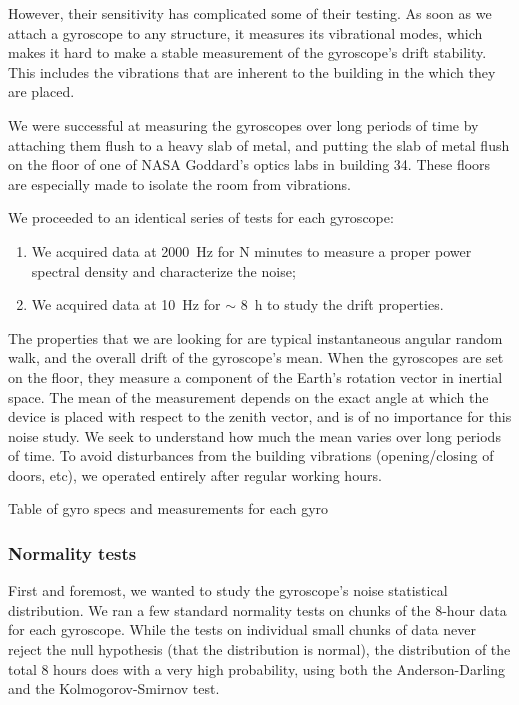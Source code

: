 However, their sensitivity has complicated some of their testing. As soon as we attach a gyroscope to any structure, it measures its vibrational modes, which makes it hard to make a stable measurement of the gyroscope's drift stability. This includes the vibrations that are inherent to the building in the which they are placed.

We were successful at measuring the gyroscopes over long periods of time by attaching them flush to a heavy slab of metal, and putting the slab of metal flush on the floor of one of NASA Goddard's optics labs in building 34. These floors are especially made to isolate the room from vibrations.

We proceeded to an identical series of tests for each gyroscope:
\begin{enumerate}
\item We acquired data at \SI{2000}{\hertz} for N minutes to measure a proper power spectral density and characterize the noise;
\item We acquired data at \SI{10}{\hertz} for $\sim$ \SI{8}{\hour} to study the drift properties.
\end{enumerate}

The properties that we are looking for are typical instantaneous angular random walk, and the overall drift of the gyroscope's mean. When the gyroscopes are set on the floor, they measure a component of the Earth's rotation vector in inertial space. The mean of the measurement depends on the exact angle at which the device is placed with respect to the zenith vector, and is of no importance for this noise study. We seek to understand how much the mean varies over long periods of time. To avoid disturbances from the building vibrations (opening/closing of doors, etc), we operated entirely after regular working hours.

Table of gyro specs and measurements for each gyro

\subsubsection{Normality tests}
First and foremost, we wanted to study the gyroscope's noise statistical distribution. We ran a few standard normality tests on chunks of the 8-hour data for each gyroscope. While the tests on individual small chunks of data never reject the null hypothesis (that the distribution is normal), the distribution of the total 8 hours does with a very high probability, using both the Anderson-Darling and the Kolmogorov-Smirnov test.

